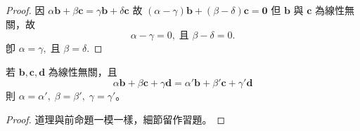 \begin{proof}
因 $\alpha \mathbf{b} + \beta \mathbf{c} = \gamma \mathbf{b} + \delta \mathbf{c}$
故 $(\alpha - \gamma)\mathbf{b} + (\beta - \delta)\mathbf{c} = \mathbf{0}$
但 $\mathbf{b}$ 與 $\mathbf{c}$ 為線性無關，故
\[ \alpha - \gamma = 0,\; \text{且 } \beta - \delta = 0. \]
卽 $\alpha = \gamma,\; \text{且 } \beta = \delta.$
\end{proof}

\begin{prop}
\label{prop:b3s-5-2}
若 $\mathbf{b}, \mathbf{c}, \mathbf{d}$ 為線性無關，且
\[ \alpha \mathbf{b} + \beta \mathbf{c} + \gamma \mathbf{d} = \alpha'\mathbf{b} + \beta'\mathbf{c} + \gamma'\mathbf{d} \]
則 $\alpha = \alpha',\; \beta = \beta',\; \gamma = \gamma'$。
\end{prop}
\begin{proof}
道理與前命題一模一樣，細節留作習題。
\end{proof}

